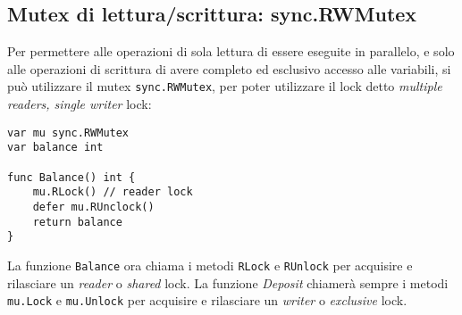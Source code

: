 \documentclass[../../thesis.tex]{subfiles}
\begin{document}
    \subsection{Mutex di lettura/scrittura: sync.RWMutex}\label{subsec:mutex-di-lettura/scrittura:-sync.rwmutex}
    Per permettere alle operazioni di sola lettura di essere eseguite in parallelo, e solo alle operazioni di scrittura di avere completo ed esclusivo accesso alle variabili, si può utilizzare il mutex \verb"sync.RWMutex", per poter utilizzare il lock detto \textit{multiple readers, single writer} lock:
    \begin{lstlisting}[frame = single, label = {lst:lstlisting9-3.1}]
var mu sync.RWMutex
var balance int

func Balance() int {
    mu.RLock() // reader lock
    defer mu.RUnclock()
    return balance
}
    \end{lstlisting}
    La funzione \verb"Balance" ora chiama i metodi \verb"RLock" e \verb"RUnlock" per acquisire e rilasciare un \textit{reader} o \textit{shared} lock.
    La funzione \textit{Deposit} chiamerà sempre i metodi \verb"mu.Lock" e \verb"mu.Unlock" per acquisire e rilasciare un \textit{writer} o \textit{exclusive} lock.
\end{document}
